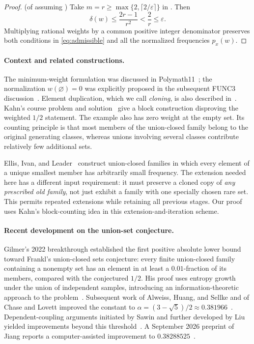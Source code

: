 \documentclass[11pt]{article}
\newcommand{\<}{\langle}
\renewcommand{\>}{\rangle}
\numberwithin{equation}{section}
\begin{document}
\begin{proof}(of  assuming )
    Take $m=r\ge\max\{2,\lceil2/\varepsilon\rceil\}$ in
. Then
\[
 \delta(w)\le\frac{2r-1}{r^2}<\frac2r\le\varepsilon.
\]
Multiplying rational weights by a common positive integer denominator
preserves both conditions in \eqref{eq:admissible} and all the normalized
frequencies $p_x(w)$.
\end{proof}

\paragraph{Context and related constructions.}
The minimum-weight formulation was discussed in Polymath11~\cite{Gowers1};
the normalization $w(\varnothing)=0$ was explicitly proposed in the subsequent
FUNC3 discussion~\cite{Gowers3}. Element duplication, which we call
\emph{cloning}, is also described in~\cite{Gowers1}. Kahn's course problem and
solution~\cite{KahnProblem,KahnSolution} give a block construction disproving
the weighted $1/2$ statement. The example also has zero weight at the empty
set. Its counting principle is that most members of the union-closed family
belong to the original generating classes, whereas unions involving several
classes contribute relatively few additional sets.

Ellis, Ivan, and Leader~\cite{EIL} construct union-closed families in which
every element of a unique smallest member has arbitrarily small frequency.
The extension needed here has a different input requirement: it must preserve
a cloned copy of \emph{any prescribed old family}, not just exhibit a family
with one specially chosen rare set. This permits repeated extensions while
retaining all previous stages. Our proof uses Kahn's block-counting idea in
this extension-and-iteration scheme. 

\paragraph{Recent development on the union-set conjecture.}
Gilmer's 2022 breakthrough established the first positive absolute lower bound toward Frankl's union-closed sets conjecture: every finite union-closed family containing a nonempty set has an element in at least a $0.01$-fraction of its members, compared with the conjectured $1/2$. His proof uses entropy growth under the union of independent samples, introducing an information-theoretic approach to the problem~\cite{Gilmer2022}. Subsequent work of Alweiss, Huang, and Sellke and of Chase and Lovett improved the constant to $\alpha=(3-\sqrt{5})/2\approx0.381966$~\cite{AHS2022,CL2022}. Dependent-coupling arguments initiated by Sawin and further developed by Liu yielded improvements beyond this threshold~\cite{Sawin2023,Liu2023}. A September 2026 preprint of Jiang reports a computer-assisted improvement to $0.38288525$~\cite{Jiang2026}.
\end{document}
